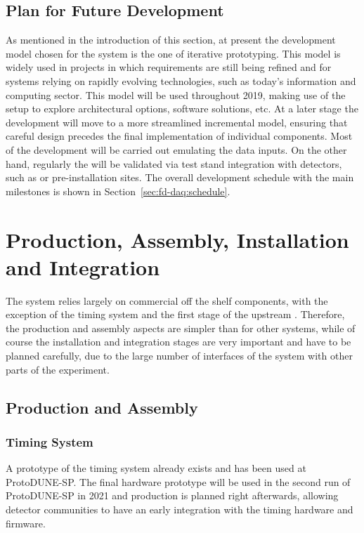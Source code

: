 \subsection{Plan for Future Development}
\label{sec:sp-daq:design-plans}

As mentioned in the introduction of this section, at present the development model chosen for the  system is the one of iterative prototyping.
This model is widely used in projects in which requirements are still being refined and for systems relying on rapidly evolving technologies, such as today's information and computing sector. 
This model will be used throughout 2019, making use of the  setup to explore architectural options, software solutions, etc.
At a later stage the  development will move to a more streamlined incremental model, ensuring that careful design precedes the final implementation of individual components.
Most of the development will be carried out emulating the data inputs.
On the other hand, regularly the  will be validated via test stand integration with detectors, such as  or pre-installation sites.
The overall development schedule with the main  milestones is shown in Section~\ref{sec:fd-daq:schedule}.

\section{Production, Assembly, Installation and Integration}
\label{sec:sp-daq:production}

The  system relies largely on commercial off the shelf components, with the exception of the timing system and the first stage of the upstream .
Therefore, the production and assembly aspects are simpler than for other systems, while of course the installation and integration stages are very important and have to be planned carefully, due to the large number of interfaces of the  system with other parts of the experiment.

\subsection{Production and Assembly}
\subsubsection{Timing System}
A prototype of the timing system already exists and has been used at ProtoDUNE-SP. The final hardware prototype will be used in the second run of ProtoDUNE-SP in 2021 and production is planned right afterwards, allowing detector communities to have an early integration with the timing hardware and firmware.

